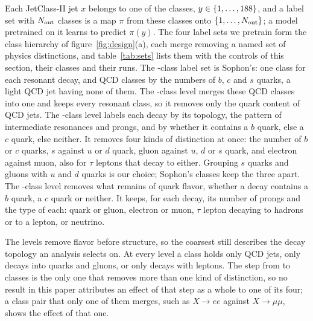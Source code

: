 Each JetClass-II jet $x$ belongs to one of the \Kfull{} classes, $y\in\{1,\dots,188\}$, and a label set with
$N_{\mathrm{out}}$ classes is a map $\pi$ from these classes onto $\{1,\dots,N_{\mathrm{out}}\}$; a model pretrained on it learns to
predict $\pi(y)$. The four label sets we pretrain form the class hierarchy of figure~\ref{fig:design}(a), each
merge removing a named set of physics distinctions, and table~\ref{tab:sets} lists them with the controls of
this section, their classes and their runs. The \Kfull-class label set is Sophon's: one class for each resonant
decay, and \LitJetClassTwoNQcdClasses{} QCD classes by the numbers of $b$, $c$ and $s$ quarks, a light QCD jet
having none of them. The \Kres-class level merges these QCD classes into one and keeps every resonant class, so it removes
only the quark content of QCD jets. The \Kmid-class level labels each decay by its topology, the pattern of
intermediate resonances and prongs, and by whether it contains a $b$ quark, else a $c$ quark, else neither. It
removes four kinds of distinction at once: the number of $b$ or $c$ quarks, $s$ against $u$ or $d$ quark, gluon
against $u$, $d$ or $s$ quark, and electron against muon, also for $\tau$ leptons that decay to either. Grouping
$s$ quarks and gluons with $u$ and $d$ quarks is our choice; Sophon's classes keep the three apart. The
\Kcoarse-class level removes what remains of quark flavor, whether a decay contains a $b$ quark, a $c$ quark or
neither. It keeps, for each decay, its number of prongs and the type of each: quark or gluon, electron or muon,
$\tau$ lepton decaying to hadrons or to a lepton, or neutrino.

The levels remove flavor before structure, so the coarsest still describes the decay topology an analysis
selects on. At every level a class holds only QCD jets, only decays into quarks and gluons, or only decays with
leptons. The step from \Kres{} to \Kmid{} classes is the only one that removes more than one kind of
distinction, so no result in this paper attributes an effect of that step as a whole to one of its four; a class
pair that only one of them merges, such as $X\to ee$ against $X\to\mu\mu$, shows the effect of that one.



